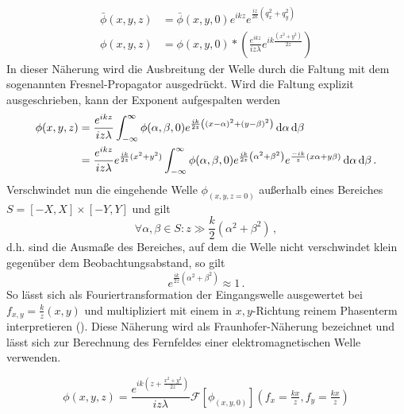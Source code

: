 \begin{align}
	\bar{\phi}(x,y, z) & =\bar{\phi}(x,y,0) e^{ik z}e^{\frac{i z}{2k}(q_x^2+q_y^2)} 
	\label{eq:fresnel_fourier}\\
	\phi(x,y, z)       & =\phi(x,y,0) \ast \left(                                   
	\frac{e^{ik z}}{i z \lambda } 
	e^{ik\frac{(x^2+y^2)}{2 z}}
	\right)
	\label{eq:fresnel_real}
\end{align}
In dieser Näherung wird die Ausbreitung der Welle durch die Faltung mit dem sogenannten Fresnel-Propagator ausgedrückt. Wird die Faltung explizit ausgeschrieben, kann der Exponent aufgespalten werden
\begin{align}
\label{eq:fresnel_explizit}
	\phi(x,y, z) & =\frac{e^{ikz}}{iz\lambda}                           
	\int_{-\infty}^\infty 
	\phi(\alpha,\beta,0)
	e^{\frac{ik}{2z}\left(\left(x-\alpha\right)^2+\left(y-\beta\right)^2\right)}
	\dif \alpha \dif \beta \nonumber \\
	             & =\frac{e^{ikz}}{iz\lambda}e^{\frac{ik}{2z}(x^2+y^2)} 
	\int_{-\infty}^\infty 
	\phi(\alpha,\beta,0)
	e^{\frac{ik}{2z}\left(\alpha^2+\beta^2\right)}
	e^{\frac{-ik}{ z}\left(x\alpha+y\beta\right)}
	\dif \alpha \dif \beta \,.
\end{align}
Verschwindet nun die eingehende Welle $\phi_(x,y,z=0)$ außerhalb eines Bereiches $S=[-X,X]\times[-Y,Y]$ und gilt 
\begin{equation}
	\forall \alpha,\beta \in S:	z\gg \frac{k}{2}\left(\alpha^2+\beta^2\right) \, , 
\end{equation}
d.h. sind die Ausmaße des Bereiches, auf dem die Welle nicht verschwindet klein gegenüber dem Beobachtungsabstand, so gilt
\begin{equation}
	e^{\frac{ik}{2z}\left(\alpha^2+\beta^2\right)}\approx 1 \,.
\end{equation}
So lässt sich  als Fouriertransformation der Eingangswelle ausgewertet bei $f_{x,y}=\tfrac{k}{z}(x,y)$ und multipliziert mit einem in $x,y$-Richtung reinem Phasenterm interpretieren (). Diese Näherung wird als Fraunhofer-Näherung bezeichnet und lässt sich zur Berechnung des Fernfeldes einer elektromagnetischen Welle verwenden.

\begin{equation}
\label{eq:fraunhofer}
	\phi(x,y,z)=\frac{e^{ik(z+\frac{x^2+y^2}{2z})}}{iz\lambda}\mathscr{F}\left[\phi_(x,y,0)\right](f_x=\tfrac{kx}{z},f_y=\tfrac{kx}{z})
\end{equation}


